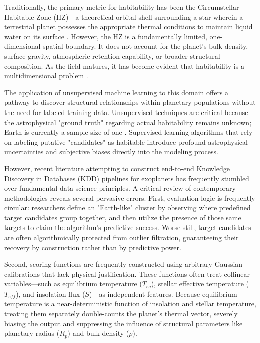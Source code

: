 Traditionally, the primary metric for habitability has been the Circumstellar Habitable Zone (HZ)---a theoretical orbital shell surrounding a star wherein a terrestrial planet possesses the appropriate thermal conditions to maintain liquid water on its surface \cite{PostMainSequence}. However, the HZ is a fundamentally limited, one-dimensional spatial boundary. It does not account for the planet's bulk density, surface gravity, atmospheric retention capability, or broader structural composition. As the field matures, it has become evident that habitability is a multidimensional problem \cite{EffectiveStellarFlux}.

The application of unsupervised machine learning to this domain offers a pathway to discover structural relationships within planetary populations without the need for labeled training data. Unsupervised techniques are critical because the astrophysical "ground truth" regarding actual habitability remains unknown; Earth is currently a sample size of one \cite{DynamicalStability}. Supervised learning algorithms that rely on labeling putative "candidates" as habitable introduce profound astrophysical uncertainties and subjective biases directly into the modeling process.

However, recent literature attempting to construct end-to-end Knowledge Discovery in Databases (KDD) pipelines for exoplanets has frequently stumbled over fundamental data science principles. A critical review of contemporary methodologies reveals several pervasive errors. First, evaluation logic is frequently circular: researchers define an "Earth-like" cluster by observing where predefined target candidates group together, and then utilize the presence of those same targets to claim the algorithm's predictive success. Worse still, target candidates are often algorithmically protected from outlier filtration, guaranteeing their recovery by construction rather than by predictive power.

Second, scoring functions are frequently constructed using arbitrary Gaussian calibrations that lack physical justification. These functions often treat collinear variables---such as equilibrium temperature ($T_{eq}$), stellar effective temperature ($T_{eff}$), and insolation flux ($S$)---as independent features. Because equilibrium temperature is a near-deterministic function of insolation and stellar temperature, treating them separately double-counts the planet's thermal vector, severely biasing the output and suppressing the influence of structural parameters like planetary radius ($R_p$) and bulk density ($\rho$).

